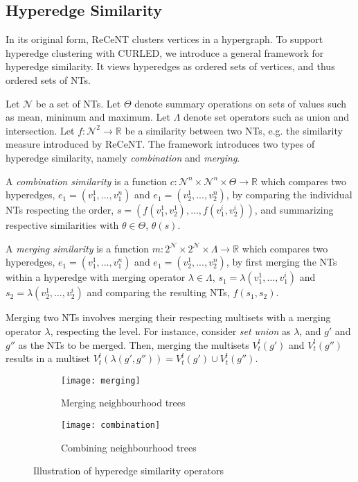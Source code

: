 \subsection{Hyperedge Similarity}

In its original form, ReCeNT clusters vertices in a hypergraph.
To support hyperedge clustering with CURLED, we introduce a general framework for hyperedge similarity.
It views hyperedges as ordered sets of vertices, and thus ordered sets of NTs.


Let $\mathcal{N}$ be a set of NTs.
Let $\Theta$ denote summary operations on sets of values such as mean, minimum and maximum.
Let $\Lambda$ denote set operators such as union and intersection.
Let $f: \mathcal{N}^2 \rightarrow \mathbb{R}$ be a similarity between two NTs, e.g. the similarity measure introduced by ReCeNT.
The framework introduces two types of hyperedge similarity, namely \textit{combination} and \textit{merging}.


\begin{definition}
A \textit{combination similarity} is a function $c: \mathcal{N}^n \times \mathcal{N}^n \times \Theta \rightarrow \mathbb{R}$ which compares two hyperedges, $e_1 = (v_1^1,..., v_1^n)$ and $e_1 = (v_2^1,..., v_2^n)$, by comparing the individual NTs respecting the order, $s = \left(f(v_1^1,v_2^1),\ldots,f(v_1^i,v_2^i) \right)$, and summarizing respective similarities with $\theta \in \Theta$,  $\theta(s)$. 
\end{definition}

\begin{definition}
A \textit{merging similarity} is a function $m: 2^{\mathcal{N}} \times 2^{\mathcal{N}} \times \Lambda \rightarrow \mathbb{R}$ which compares two hyperedges, $e_1 = (v_1^1,..., v_1^n)$ and $e_1 = (v_2^1,..., v_2^n)$, by first merging the NTs within a hyperedge with merging operator $\lambda \in \Lambda$, $s_1 = \lambda (v_1^1,\ldots,v_1^i)$ and $s_2 = \lambda (v_2^1,\ldots,v_2^i)$ and comparing the resulting NTs, $f(s_1,s_2)$.  
\end{definition}


Merging two NTs involves merging their respecting multisets with a merging operator $\lambda$, respecting the level.
For instance, consider \textit{set union} as $\lambda$, and $g'$ and $g''$ as the NTs to be merged.
Then, merging the multisets $V^l_{t}(g')$ and $V^l_{t}(g'')$ results in a multiset $V^l_{t}\left(\lambda(g',g'')\right) = V^l_{t}(g') \cup V^l_{t}(g'')$.


\begin{figure}
	\centering
	\begin{subfigure}{\linewidth}
		\centering
		\texttt{[image: merging]}
		\caption{Merging neighbourhood trees\label{fig:ntmerging}}
	\end{subfigure}
	
	\begin{subfigure}{\linewidth}
		\centering
		\texttt{[image: combination]}
		\caption{Combining neighbourhood trees\label{fig:ntcombination}}
	\end{subfigure}
	\caption{Illustration of hyperedge similarity operators}
\end{figure}


